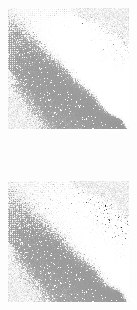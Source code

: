 
\begin{figure}
\center

	\begin{subfigure}[t]{0.22\textwidth}
		\center
		\includegraphics[width=\textwidth]{images/findings/experiments/regularization/strats/0.50/hand_max_min.png}
		\caption{\handmaxmin}
	\end{subfigure}
	~
	\begin{subfigure}[t]{0.22\textwidth}
		\center
		\includegraphics[width=\textwidth]{images/findings/experiments/regularization/strats/0.50/hand_max_avg.png}

\end{subfigure}
\end{figure}
